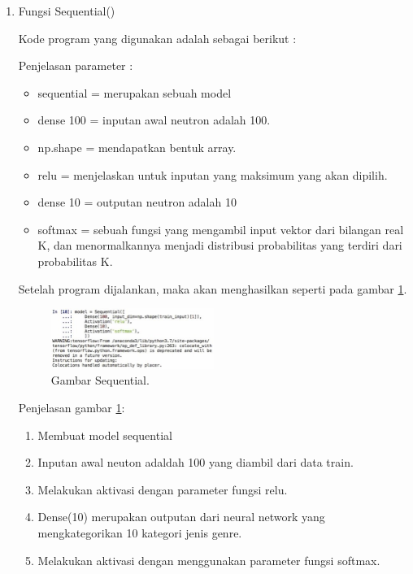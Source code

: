 \begin{enumerate}
\item Fungsi Sequential()
	\par Kode program yang digunakan adalah sebagai berikut :
	
	\par Penjelasan parameter :
	\begin{itemize}
	\item sequential = merupakan sebuah model
	\item dense 100 = inputan awal neutron adalah 100.
	\item np.shape = mendapatkan bentuk array.
	\item relu = menjelaskan untuk inputan yang maksimum yang akan dipilih.
	\item dense 10 = outputan neutron adalah 10
	\item softmax = sebuah fungsi yang mengambil input vektor dari bilangan real K, dan menormalkannya menjadi distribusi probabilitas yang terdiri dari probabilitas K.
	\end{itemize}
	
	\par Setelah program dijalankan, maka akan menghasilkan seperti pada gambar \ref{no15}.
	
		\begin{figure}[ht]
		\centerline{\includegraphics[width=0.5\textwidth]{figures/chapter6/no15.jpg}}
		\caption{Gambar Sequential.}
		\label{no15}
		\end{figure}
		
	\par Penjelasan gambar \ref{no15}:
	\begin{enumerate}
	\item Membuat model sequential
	\item Inputan awal neuton adaldah 100 yang diambil dari data train. 
	\item Melakukan aktivasi dengan parameter fungsi relu.
	\item Dense(10) merupakan outputan dari neural network  yang mengkategorikan 10 kategori jenis genre.
	\item Melakukan aktivasi dengan menggunakan parameter fungsi softmax.
	\end{enumerate}


\end{enumerate}
